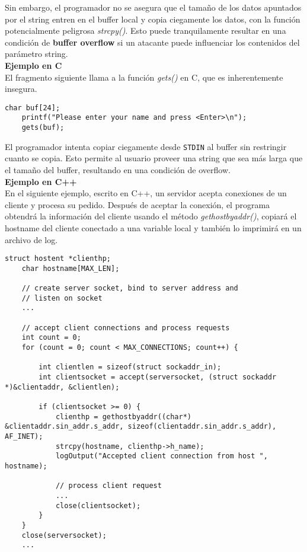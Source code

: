 Sin embargo, el programador no se asegura que el tamaño de los datos apuntados por el string entren en el buffer local y copia ciegamente los datos, con la
función potencialmente peligrosa \textit{strcpy()}. Esto puede tranquilamente resultar en una condición de \textbf{buffer overflow}
si un atacante puede influenciar los contenidos del parámetro string. \\

\noindent \textbf{Ejemplo en C}\\

El fragmento siguiente llama a la función \textit{gets()} en C, que es inherentemente insegura.

\begin{lstlisting}[frame=single]
    char buf[24];
    printf("Please enter your name and press <Enter>\n");
    gets(buf);
\end{lstlisting}

El programador intenta copiar ciegamente desde \texttt{STDIN} al buffer sin restringir
cuanto se copia. Esto permite al usuario proveer una string que sea más larga que el tamaño del buffer, resultando en una condición de overflow.\\

\noindent \textbf{Ejemplo en C++}\\

En el siguiente ejemplo, escrito en C++, un servidor acepta conexiones de un cliente y procesa su pedido. Después de aceptar la conexión, el programa obtendrá la información del cliente
usando el método \textit{gethostbyaddr()}, copiará el hostname del cliente conectado a una variable local y también lo imprimirá en un archivo de log.

\begin{lstlisting}[frame=single]
    struct hostent *clienthp;
    char hostname[MAX_LEN];

    // create server socket, bind to server address and
    // listen on socket
    ...

    // accept client connections and process requests
    int count = 0;
    for (count = 0; count < MAX_CONNECTIONS; count++) {

        int clientlen = sizeof(struct sockaddr_in);
        int clientsocket = accept(serversocket, (struct sockaddr *)&clientaddr, &clientlen);

        if (clientsocket >= 0) {
            clienthp = gethostbyaddr((char*) &clientaddr.sin_addr.s_addr, sizeof(clientaddr.sin_addr.s_addr), AF_INET);
            strcpy(hostname, clienthp->h_name);
            logOutput("Accepted client connection from host ", hostname);

            // process client request
            ...
            close(clientsocket);
        }
    }
    close(serversocket);
    ...
\end{lstlisting}

